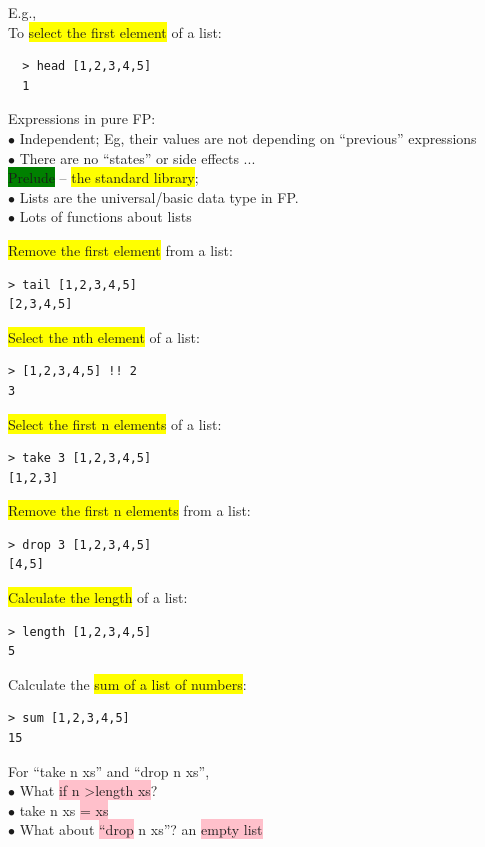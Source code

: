 \documentclass[tikz,border=10pt]{project_plan}
\newcommand{\bulletPoint}{\hspace{-3.1pt}$\bullet$ \hspace{5pt}}
\begin{document}
E.g., \\
To \colorbox{yellow}{select the first element} of a list:
\begin{lstlisting}
  > head [1,2,3,4,5]
  1
\end{lstlisting}

Expressions in pure FP:\\
\bulletPoint Independent; Eg, their values are not depending on “previous” expressions\\
\bulletPoint There are no “states” or side effects ...\\

\colorbox{green}{Prelude} – \colorbox{yellow}{the standard library};\\
\bulletPoint Lists are the universal/basic data type in FP.\\
\bulletPoint Lots of functions about lists

\colorbox{yellow}{Remove the first element} from a list:
\begin{lstlisting}
> tail [1,2,3,4,5]
[2,3,4,5]
\end{lstlisting}

\colorbox{yellow}{Select the nth element} of a list:
\begin{lstlisting}
> [1,2,3,4,5] !! 2
3
\end{lstlisting}

\colorbox{yellow}{Select the first n elements} of a list:
\begin{lstlisting}
> take 3 [1,2,3,4,5]
[1,2,3]
\end{lstlisting}

\colorbox{yellow}{Remove the first n elements} from a list:
\begin{lstlisting}
> drop 3 [1,2,3,4,5]
[4,5]
\end{lstlisting}

\colorbox{yellow}{Calculate the length} of a list:
\begin{lstlisting}
> length [1,2,3,4,5]
5
\end{lstlisting}

\newpage

Calculate the \colorbox{yellow}{sum of a list of numbers}:
\begin{lstlisting}
> sum [1,2,3,4,5]
15
\end{lstlisting}

For “take n xs” and “drop n xs”,\\
\bulletPoint What \colorbox{pink}{if n \textgreater length xs}?\\
\bulletPoint take n xs \colorbox{pink}{= xs}\\
\bulletPoint What about \colorbox{pink}{“drop} n xs”? an \colorbox{pink}{empty list}\\
\end{document}
